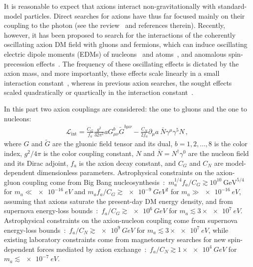 It is reasonable to expect that axions interact non-gravitationally with standard-model particles.
Direct searches for axions have thus far focused mainly on their coupling to the photon (see the review~\cite{Axion-Review2015} and references therein).
Recently, however, it has been proposed to search for the interactions of the coherently oscillating axion DM field with gluons and fermions, which can induce oscillating electric dipole moments (EDMs) of nucleons~\cite{Graham2011} and atoms~\cite{Stadnik2014A,Roberts2014A,Roberts2014B}, and anomalous spin-precession effects~\cite{Flambaum2013Patras,Stadnik2014A,Graham2013}.
The frequency of these oscillating effects is dictated by the axion mass, and more importantly, these effects scale linearly in a small interaction constant~\cite{Graham2011,Stadnik2014A,Roberts2014A,Roberts2014B,Flambaum2013Patras,Graham2013}, whereas in previous axion searches, the sought effects scaled quadratically or quartically in the interaction constant~\cite{Axion-Review2015}.

In this part two axion couplings are considered: the one to gluons and the one to nucleons:
\begin{align}
\label{Axion_couplings}
\mathcal{L}_{\textrm{int}} = \frac{C_G}{f_a} \frac{g^2}{32\pi^2} a G^{b}_{\mu \nu} \tilde{G}^{b \mu \nu}  - \frac{C_N}{2f_a} \partial_\mu a ~ \bar{N} \gamma^\mu \gamma^5 N \, ,
\end{align}
where $G$ and $\tilde{G}$ are the gluonic field tensor and its dual, $b=1,2,\ldots,8$ is the  color index, $g^2 / 4 \pi$ is the color coupling constant, {\color{black}$N$ and $\bar{N} = N^\dagger \gamma^0$ are the nucleon field and its Dirac adjoint,} $f_a$ is the axion decay constant, and $C_G$ and {\color{black}$C_N$} are model-dependent dimensionless parameters.
Astrophysical constraints on the axion-gluon coupling come from Big Bang nucleosynthesis~\cite{Blum2014,StadnikThesis,Stadnik2015D}:~$m_a^{1/4} f_a / C_G \gtrsim 10^{10}~\textrm{GeV}^{5/4}$ for $m_a \ll \SI{e-16}{eV}$ and $m_a f_a / C_G \gtrsim \SI{e-9}{GeV^2}$ for $m_a \gg \SI{e-16}{eV}$, assuming that axions saturate the present-day DM energy density,
and from supernova energy-loss bounds~\cite{Graham2013,Raffelt1990Review}:~$f_a / C_G \gtrsim \SI{e6}{GeV}$ for $m_a \lesssim 3 \times \SI{e7}{eV}$.
{\color{black}Astrophysical constraints on the axion-nucleon coupling come from supernova energy-loss bounds~\cite{Raffelt1990Review,Raffelt2008LNP}:~$f_a / C_N \gtrsim \SI{e9}{GeV}$ for $m_a \lesssim 3 \times \SI{e7}{eV}$, while existing laboratory constraints come from magnetometry searches for new spin-dependent forces mediated by axion exchange~\cite{Romalis2009_NF}:~$f_a / C_N \gtrsim 1 \times \SI{e4}{GeV}$ for $m_a \lesssim \SI{e-7}{eV}$. }

